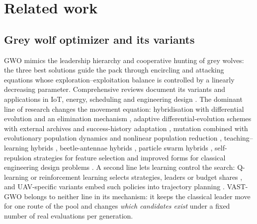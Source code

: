 \documentclass[11pt,a4paper]{article}
\newcommand{\method}{VAST-GWO}
\begin{document}
\section{Related work}
\label{sec:related}
\subsection{Grey wolf optimizer and its variants}
GWO \citep{mirjalili2014gwo} mimics the leadership hierarchy and cooperative
hunting of grey wolves: the three best solutions guide the pack through
encircling and attacking equations whose exploration--exploitation balance is
controlled by a linearly decreasing parameter. Comprehensive reviews document
its variants and applications in IoT, energy, scheduling and engineering
design \citep{nadimishahraki2024iot,makhadmeh2023review}. The dominant line of
research changes the movement equation: hybridisation with differential
evolution and an elimination mechanism \citep{wang2019igwode}, adaptive
differential-evolution schemes with external archives and success-history
adaptation \citep{zhang2009jade,tanabe2013shade,tanabe2014lshade}, mutation
combined with evolutionary population dynamics and nonlinear population
reduction \citep{zhang2025mutation}, teaching--learning hybrids
\citep{singh2025tlbo}, beetle-antennae hybrids \citep{zhang2025bagwo}, particle
swarm hybrids \citep{shaikh2025hybrid}, self-repulsion strategies for feature
selection \citep{wang2025selfrepulsion} and improved forms for classical
engineering design problems \citep{nadimi2021igwo,li2021sustainability}. A
second line lets learning control the search: Q-learning or reinforcement
learning selects strategies, leaders or budget shares
\citep{watkins1992q,auer2002ucb,yin2026amsgwo,huang2026qlfdgwo,khalid2026aogwo,wang2026dmsgwo}, and
UAV-specific variants embed such policies into trajectory planning
\citep{nayeem2025drones,jia2025drones}. \method{} belongs to neither line in
its mechanism: it keeps the classical leader move for one route of the pool and
changes \emph{which candidates exist} under a fixed number of real evaluations
per generation.
\end{document}
